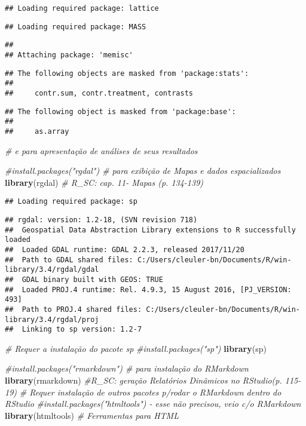 \documentclass[]{article}
\newenvironment{Shaded}{\begin{snugshade}}{\end{snugshade}}
\newcommand{\KeywordTok}[1]{\textcolor[rgb]{0.13,0.29,0.53}{\textbf{#1}}}
\newcommand{\CommentTok}[1]{\textcolor[rgb]{0.56,0.35,0.01}{\textit{#1}}}
\newcommand{\NormalTok}[1]{#1}
\begin{document}
\begin{verbatim}
## Loading required package: lattice
\end{verbatim}

\begin{verbatim}
## Loading required package: MASS
\end{verbatim}

\begin{verbatim}
## 
## Attaching package: 'memisc'
\end{verbatim}

\begin{verbatim}
## The following objects are masked from 'package:stats':
## 
##     contr.sum, contr.treatment, contrasts
\end{verbatim}

\begin{verbatim}
## The following object is masked from 'package:base':
## 
##     as.array
\end{verbatim}

\begin{Shaded}
\begin{Highlighting}[]
                \CommentTok{# e para apresentação de análises de seus resultados}

\CommentTok{#install.packages("rgdal") # para exibição de Mapas e dados espacializados}
\KeywordTok{library}\NormalTok{(rgdal) }\CommentTok{# R_SC: cap. 11- Mapas (p. 134-139)}
\end{Highlighting}
\end{Shaded}

\begin{verbatim}
## Loading required package: sp
\end{verbatim}

\begin{verbatim}
## rgdal: version: 1.2-18, (SVN revision 718)
##  Geospatial Data Abstraction Library extensions to R successfully loaded
##  Loaded GDAL runtime: GDAL 2.2.3, released 2017/11/20
##  Path to GDAL shared files: C:/Users/cleuler-bn/Documents/R/win-library/3.4/rgdal/gdal
##  GDAL binary built with GEOS: TRUE 
##  Loaded PROJ.4 runtime: Rel. 4.9.3, 15 August 2016, [PJ_VERSION: 493]
##  Path to PROJ.4 shared files: C:/Users/cleuler-bn/Documents/R/win-library/3.4/rgdal/proj
##  Linking to sp version: 1.2-7
\end{verbatim}

\begin{Shaded}
\begin{Highlighting}[]
\CommentTok{# Requer a instalação do pacote sp}
\CommentTok{#install.packages("sp")}
\KeywordTok{library}\NormalTok{(sp)}

\CommentTok{#install.packages("rmarkdown") # para instalação do RMarkdown}
\KeywordTok{library}\NormalTok{(rmarkdown) }\CommentTok{#R_SC: geração Relatórios Dinâmicos no RStudio(p. 115-19)}
\CommentTok{# Requer instalação de outros pacotes p/rodar o RMarkdown dentro do RStudio}
\CommentTok{#install.packages("htmltools") - esse não precisou, veio c/o RMarkdown}
\KeywordTok{library}\NormalTok{(htmltools) }\CommentTok{# Ferramentas para HTML}
\end{Highlighting}
\end{Shaded}
\end{document}
